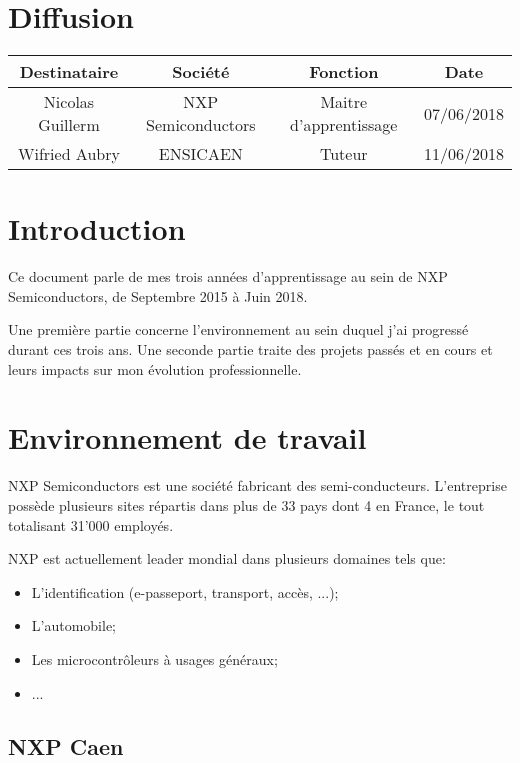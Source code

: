 \documentclass[french,12pt,a4paper,titlepage,openright,openbib]{report}
\begin{document}
{\let \clearpage \relax \chapter*{Diffusion}}
\begin{table}[ht]
	\label{tab:diffusion}
	\centering
	\begin{tabular}{|c|c|c|c|}
		\hline
		{\bf Destinataire} & {\bf Société}      & {\bf Fonction}   		 & {\bf Date}\\
		\hline
		Nicolas Guillerm   & NXP Semiconductors & Maitre d'apprentissage & 07/06/2018 \\
		\hline
		Wifried Aubry      & ENSICAEN 			& Tuteur				 & 11/06/2018 \\
		\hline
	\end{tabular}
\end{table}

\chapter{Introduction}
Ce document parle de mes trois années d'apprentissage au sein de NXP Semiconductors, de Septembre 2015 à Juin 2018.

Une première partie concerne l'environnement au sein duquel j'ai progressé durant ces trois ans.
Une seconde partie traite des projets passés et en cours et leurs impacts sur mon évolution professionnelle.

\chapter{Environnement de travail}
NXP Semiconductors est une société fabricant des semi-conducteurs.
L'entreprise possède plusieurs sites répartis dans plus de 33 pays dont 4 en France, le tout totalisant 31'000 employés.

NXP est actuellement leader mondial dans plusieurs domaines tels que:

\begin{itemize}
\item L'identification (e-passeport, transport, accès, ...);
\item L'automobile;
\item Les microcontrôleurs à usages généraux;
\item ...
\end{itemize}

\section{NXP Caen}
\end{document}
